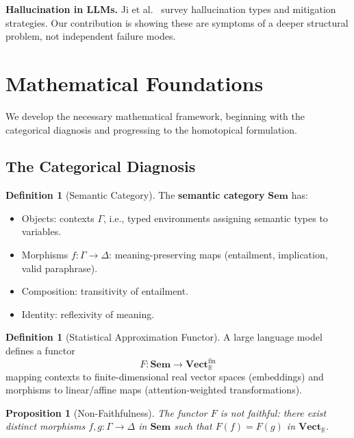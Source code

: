 \documentclass[11pt,a4paper,twocolumn]{article}
\theoremstyle{plain}
\newtheorem{proposition}[theorem]{Proposition}
\theoremstyle{definition}
\newtheorem{definition}[theorem]{Definition}
\newcommand{\Sem}{\mathbf{Sem}}
\newcommand{\Vect}{\mathbf{Vect}}
\begin{document}
\textbf{Hallucination in LLMs.} Ji et al.\ \cite{ji2023survey} survey hallucination types and mitigation strategies. Our contribution is showing these are symptoms of a deeper structural problem, not independent failure modes.

\section{Mathematical Foundations}\label{sec:foundations}

We develop the necessary mathematical framework, beginning with the categorical diagnosis and progressing to the homotopical formulation.

\subsection{The Categorical Diagnosis}

\begin{definition}[Semantic Category]\label{def:semcat}
The \textbf{semantic category} $\Sem$ has:
\begin{itemize}[nosep]
  \item Objects: contexts $\Gamma$, i.e., typed environments assigning semantic types to variables.
  \item Morphisms $f\colon \Gamma \to \Delta$: meaning-preserving maps (entailment, implication, valid paraphrase).
  \item Composition: transitivity of entailment.
  \item Identity: reflexivity of meaning.
\end{itemize}
\end{definition}

\begin{definition}[Statistical Approximation Functor]\label{def:statfunctor}
A large language model defines a functor
\[
  F\colon \Sem \to \Vect_{\mathbb{R}}^{\mathrm{fin}}
\]
mapping contexts to finite-dimensional real vector spaces (embeddings) and morphisms to linear/affine maps (attention-weighted transformations).
\end{definition}

\begin{proposition}[Non-Faithfulness]\label{prop:nonfaithful}
The functor $F$ is not faithful: there exist distinct morphisms $f, g\colon \Gamma \to \Delta$ in $\Sem$ such that $F(f) = F(g)$ in $\Vect_{\mathbb{R}}$.
\end{proposition}
\end{document}
